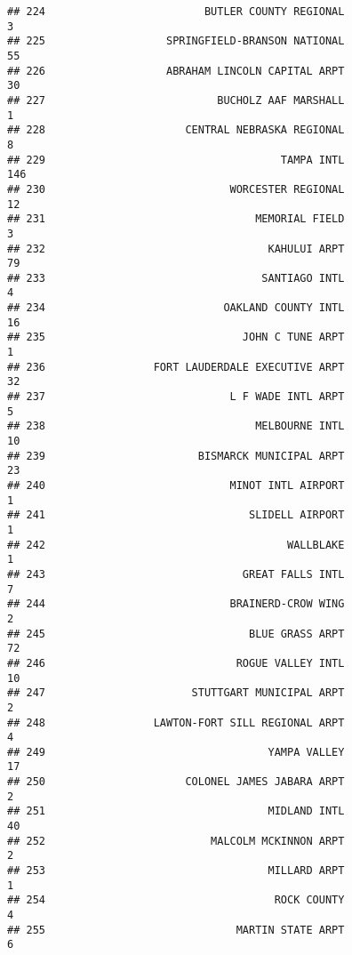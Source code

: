 \documentclass[
]{article}
\begin{document}
\begin{verbatim}
## 224                         BUTLER COUNTY REGIONAL                           3
## 225                   SPRINGFIELD-BRANSON NATIONAL                          55
## 226                   ABRAHAM LINCOLN CAPITAL ARPT                          30
## 227                           BUCHOLZ AAF MARSHALL                           1
## 228                      CENTRAL NEBRASKA REGIONAL                           8
## 229                                     TAMPA INTL                         146
## 230                             WORCESTER REGIONAL                          12
## 231                                 MEMORIAL FIELD                           3
## 232                                   KAHULUI ARPT                          79
## 233                                  SANTIAGO INTL                           4
## 234                            OAKLAND COUNTY INTL                          16
## 235                               JOHN C TUNE ARPT                           1
## 236                 FORT LAUDERDALE EXECUTIVE ARPT                          32
## 237                             L F WADE INTL ARPT                           5
## 238                                 MELBOURNE INTL                          10
## 239                        BISMARCK MUNICIPAL ARPT                          23
## 240                             MINOT INTL AIRPORT                           1
## 241                                SLIDELL AIRPORT                           1
## 242                                      WALLBLAKE                           1
## 243                               GREAT FALLS INTL                           7
## 244                             BRAINERD-CROW WING                           2
## 245                                BLUE GRASS ARPT                          72
## 246                              ROGUE VALLEY INTL                          10
## 247                       STUTTGART MUNICIPAL ARPT                           2
## 248                 LAWTON-FORT SILL REGIONAL ARPT                           4
## 249                                   YAMPA VALLEY                          17
## 250                      COLONEL JAMES JABARA ARPT                           2
## 251                                   MIDLAND INTL                          40
## 252                          MALCOLM MCKINNON ARPT                           2
## 253                                   MILLARD ARPT                           1
## 254                                    ROCK COUNTY                           4
## 255                              MARTIN STATE ARPT                           6

\end{verbatim}
\end{document}
